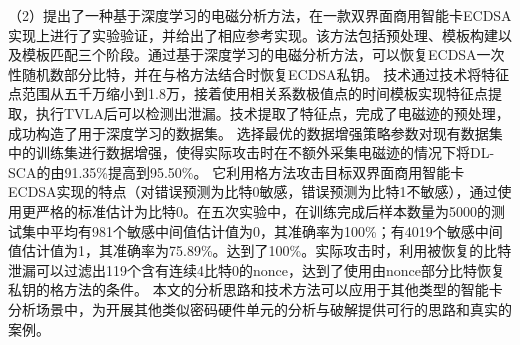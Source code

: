 {	
	（2）提出了一种基于深度学习的电磁分析方法，在一款双界面商用智能卡ECDSA实现上进行了实验验证，并给出了相应参考实现。该方法包括预处理、模板构建以及模板匹配三个阶段。通过基于深度学习的电磁分析方法，可以恢复ECDSA一次性随机数部分比特，并在与格方法结合时恢复ECDSA私钥。
	\yuchuli 技术通过\poifanwei 技术将特征点范围从五千万缩小到1.8万，接着使用相关系数极值点的时间模板实现特征点提取，执行TVLA后可以检测出泄漏。\yuchuli 技术提取了特征点，完成了电磁迹的预处理，成功构造了用于深度学习的数据集。
	\shujuzengqiang 选择最优的数据增强策略参数对现有数据集中的训练集进行数据增强，使得实际攻击时在不额外采集电磁迹的情况下将DL-SCA的\zyx 由91.35\%提高到95.50\%。
	\jiashejianyanguji 它利用格方法攻击目标双界面商用智能卡ECDSA实现的特点（对错误预测为比特0敏感，错误预测为比特1不敏感），通过使用更严格的标准估计为比特0。在五次实验中，在训练完成后样本数量为5000的测试集中平均有981个敏感中间值估计值为0，其准确率为100\%；有4019个敏感中间值估计值为1，其准确率为75.89\%。\zyx 达到了100\%。实际攻击时，利用被恢复的比特泄漏可以过滤出119个含有连续4比特0的nonce，达到了使用由nonce部分比特恢复私钥的格方法的条件。
	本文的分析思路和技术方法可以应用于其他类型的智能卡分析场景中，为开展其他类似密码硬件单元的分析与破解提供可行的思路和真实的案例。
	
	
}
